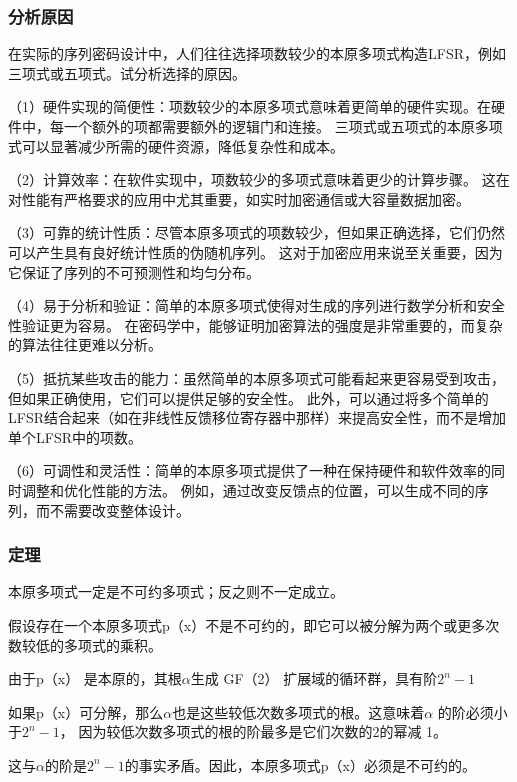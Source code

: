 \documentclass[a4paper,11pt,UTF8]{ctexart}
\begin{document}
    \subsubsection{分析原因}
      在实际的序列密码设计中，人们往往选择项数较少的本原多项式构造LFSR，例如三项式或五项式。试分析选择的原因。\par
      （1）硬件实现的简便性：项数较少的本原多项式意味着更简单的硬件实现。在硬件中，每一个额外的项都需要额外的逻辑门和连接。
          三项式或五项式的本原多项式可以显著减少所需的硬件资源，降低复杂性和成本。\par
      （2）计算效率：在软件实现中，项数较少的多项式意味着更少的计算步骤。
          这在对性能有严格要求的应用中尤其重要，如实时加密通信或大容量数据加密。\par
      （3）可靠的统计性质：尽管本原多项式的项数较少，但如果正确选择，它们仍然可以产生具有良好统计性质的伪随机序列。
          这对于加密应用来说至关重要，因为它保证了序列的不可预测性和均匀分布。\par
      （4）易于分析和验证：简单的本原多项式使得对生成的序列进行数学分析和安全性验证更为容易。
          在密码学中，能够证明加密算法的强度是非常重要的，而复杂的算法往往更难以分析。\par
      （5）抵抗某些攻击的能力：虽然简单的本原多项式可能看起来更容易受到攻击，但如果正确使用，它们可以提供足够的安全性。
          此外，可以通过将多个简单的LFSR结合起来（如在非线性反馈移位寄存器中那样）来提高安全性，而不是增加单个LFSR中的项数。\par
      （6）可调性和灵活性：简单的本原多项式提供了一种在保持硬件和软件效率的同时调整和优化性能的方法。
          例如，通过改变反馈点的位置，可以生成不同的序列，而不需要改变整体设计。\par

    \subsubsection{定理}
      本原多项式一定是不可约多项式；反之则不一定成立。\par

      假设存在一个本原多项式p（x）不是不可约的，即它可以被分解为两个或更多次数较低的多项式的乘积。\par
      由于p（x） 是本原的，其根$\alpha $生成 GF（2） 扩展域的循环群，具有阶$2^{n}-1$\par
      如果p（x）可分解，那么$\alpha $也是这些较低次数多项式的根。这意味着$\alpha $ 的阶必须小于$2^{n}-1$，
      因为较低次数多项式的根的阶最多是它们次数的2的幂减 1。\par
      这与$\alpha $的阶是$2^{n}-1$的事实矛盾。因此，本原多项式p（x）必须是不可约的。\par
\end{document}
